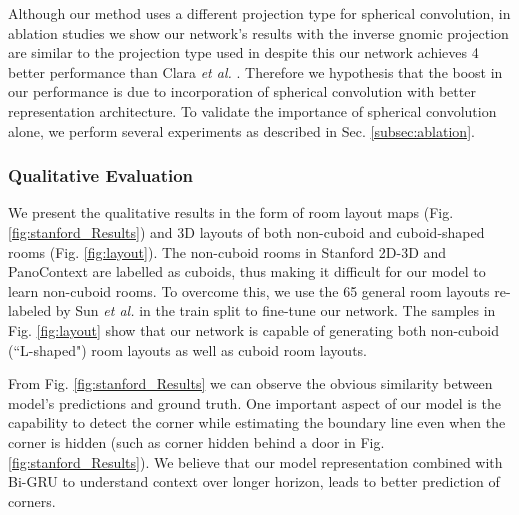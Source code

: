 \documentclass[final]{cvpr}
\begin{document}
Although our method uses a different projection type for spherical convolution, in ablation studies we show our network's results with the inverse gnomic projection are similar to the projection type used in \cite{fernandez2020corners} despite this our network achieves   4 better performance than Clara \textit{et al.} \cite{fernandez2020corners}. Therefore we hypothesis that the boost in our performance is due to incorporation of spherical convolution with better representation architecture. To validate the importance of spherical convolution alone, we perform several experiments as described in Sec. \ref{subsec:ablation}.





\subsubsection{Qualitative Evaluation}\label{subsec:qualitative}

We present the qualitative results in the form of room layout maps (Fig.\ref{fig:stanford_Results}) and 3D layouts of both non-cuboid and cuboid-shaped rooms (Fig. \ref{fig:layout}). The non-cuboid rooms in Stanford 2D-3D \cite{armeni2017joint} and PanoContext \cite{zhang2014panocontext} are labelled as cuboids, thus making it difficult for our model to learn non-cuboid rooms. To overcome this, we use the 65 general room layouts re-labeled by Sun \textit{et al.} \cite{sun2019horizonnet} in the train split to fine-tune our network. The samples in Fig. \ref{fig:layout} show that our network is capable of generating both non-cuboid (``L-shaped") room layouts as well as cuboid room layouts. 

From Fig. \ref{fig:stanford_Results} we can observe the obvious similarity between model's predictions and ground truth. One important aspect of our model is the capability to detect the corner while estimating the boundary line even when the corner is hidden (such as corner hidden behind a door in Fig. \ref{fig:stanford_Results}). We believe that our model representation combined with Bi-GRU to understand context over longer horizon, leads to better prediction of corners.
\end{document}
